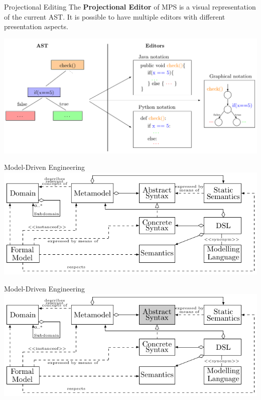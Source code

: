 	\begin{frame}{Projectional Editing}
		The \textbf{Projectional Editor} of MPS is a visual representation of the current AST. It is possible to have multiple editors with different presentation aspects.
		\begin{center}
			\includegraphics[height=0.7\textheight]{tikz/editors.pdf}
		\end{center}
	\end{frame}

	\begin{frame}{Model-Driven Engineering}
		\includegraphics[width=\textwidth]{tikz/mdsd_concept.pdf}
	\end{frame}

	\begin{frame}[noframenumbering]{Model-Driven Engineering}
		\includegraphics[width=\textwidth]{tikz/mdsd_concept_1.pdf}
	\end{frame}	
	
